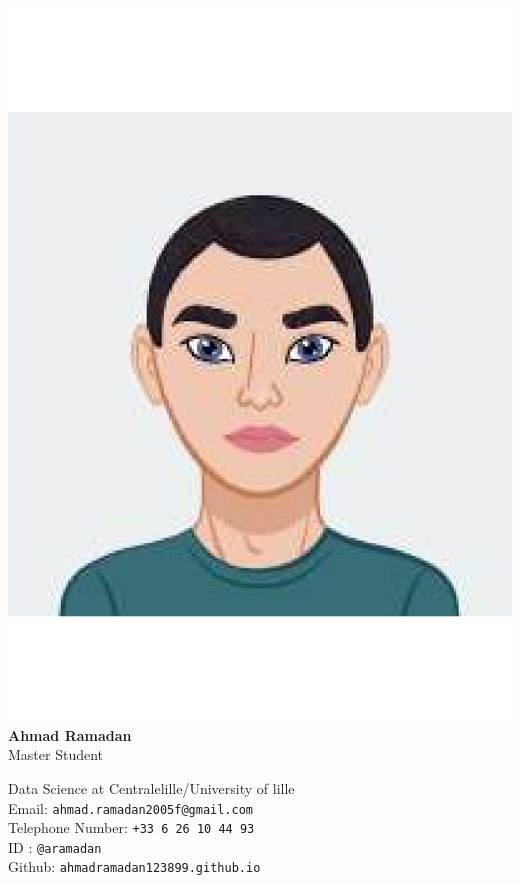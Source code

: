 \documentclass{article}
\begin{document}
\centering
\includegraphics[width=0.25\linewidth]{logo}\\[6pt]

{\Large \textbf{Ahmad Ramadan}}\\[-2pt]

\normalsize Master Student\\[6pt]

\vspace{0.3cm}


Data Science at Centralelille/University of lille\\[6pt]
\small
Email: 
\texttt{ahmad.ramadan2005f@gmail.com}\\[6pt]
Telephone Number:
\texttt{+33 6 26 10 44 93}\\[6pt]

ID : \texttt{@aramadan}\\[6pt]

Github:
\texttt{ahmadramadan123899.github.io}
\end{document}
